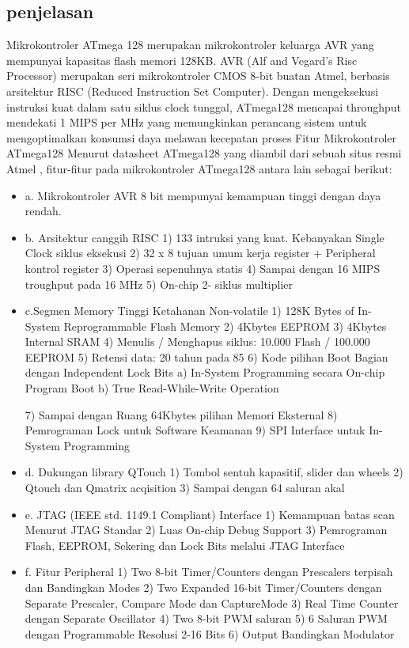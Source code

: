 	\subsection{penjelasan}
	Mikrokontroler ATmega 128 merupakan mikrokontroler keluarga AVR yang mempunyai kapasitas flash memori 128KB. AVR (Alf and Vegard’s Risc Processor) merupakan seri mikrokontroler CMOS 8-bit buatan Atmel, berbasis arsitektur RISC (Reduced Instruction Set Computer). Dengan mengeksekusi instruksi kuat dalam satu siklus clock tunggal, ATmega128 mencapai throughput mendekati 1 MIPS per MHz yang memungkinkan perancang sistem untuk mengoptimalkan konsumsi daya melawan kecepatan proses
	Fitur Mikrokontroler ATmega128
	Menurut datasheet ATmega128 yang diambil dari sebuah situs resmi Atmel , fitur-fitur pada mikrokontroler ATmega128 antara lain sebagai berikut:
	\begin{itemize}
		\item a. Mikrokontroler AVR 8 bit mempunyai kemampuan tinggi dengan daya rendah. 
		\item b. Arsitektur canggih RISC
				1) 133 intruksi yang kuat. Kebanyakan Single Clock siklus eksekusi 
				2) 32 x 8 tujuan umum kerja register + Peripheral kontrol register 
				3) Operasi sepenuhnya statis 
				4) Sampai dengan 16 MIPS troughput pada 16 MHz
				5) On-chip 2- siklus multiplier
		\item c.Segmen Memory Tinggi Ketahanan Non-volatile 
				1) 128K Bytes of In-System Reprogrammable Flash Memory
				2) 4Kbytes EEPROM
				3) 4Kbytes Internal SRAM
				4) Menulis / Menghapus siklus: 10.000 Flash / 100.000 EEPROM 
				5) Retensi data: 20 tahun pada 85 
				6) Kode pilihan Boot Bagian dengan Independent Lock Bits 
					a) In-System Programming secara On-chip Program Boot 
					b) True Read-While-Write Operation 
					
				7) Sampai dengan Ruang 64Kbytes pilihan Memori Eksternal
				8) Pemrograman Lock untuk Software Keamanan
				9) SPI Interface untuk In-System Programming
		\item d. Dukungan library QTouch
				1) Tombol sentuh kapasitif, slider dan wheels 
				2) Qtouch dan Qmatrix acqisition 
				3) Sampai dengan 64 saluran akal 
		\item e. JTAG (IEEE std. 1149.1 Compliant) Interface
				1) Kemampuan batas scan Menurut JTAG Standar
				2) Luas On-chip Debug Support 3) Pemrograman Flash, EEPROM, Sekering dan Lock Bits melalui  JTAG Interface
		\item f. Fitur Peripheral 
				1) Two 8-bit Timer/Counters dengan Prescalers terpisah dan Bandingkan Modes 
				2) Two Expanded 16-bit Timer/Counters dengan Separate Prescaler, Compare Mode dan CaptureMode 
				3) Real Time Counter dengan Separate Oscillator
				4) Two 8-bit PWM saluran 
				5) 6 Saluran PWM dengan Programmable Resolusi 2-16 Bits 
				6) Output Bandingkan Modulator

		\end{itemize}

	